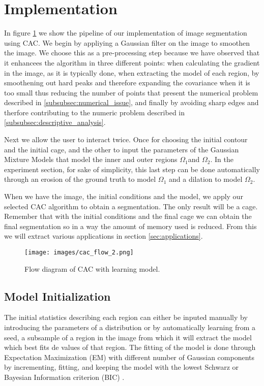 
\section{Implementation}
\label{subsec:implementation}
\noindent

In figure \ref{fig:cac_flow} we show the pipeline of our implementation of image segmentation using CAC. We begin by appliying a Gaussian filter on the image to smoothen the image. We choose this as a pre-processing step because we have observed that it enhancees the algorithm in three different points: when calculating the gradient in the image, as it is typically done, when extracting the model of each region, by smoothening out hard peaks and therefore expanding the covariance when it is too small thus reducing the number of points that present the numerical problem described in \ref{subsubsec:numerical_issue}, and finally by avoiding sharp edges and therfore contributing to the numeric problem described in \ref{subsubsec:descriptive_analysis}.

Next we allow the user to interact twice. Once for choosing the initial contour and the initial cage, and the other to input the parameters of the Gaussian Mixture Models that model the inner and outer regions $\Omega_1$and $\Omega_2$. In the experiment section, for sake of simplicity, this last step can be done automatically through an erosion of the ground truth to model $\Omega_1$ and a dilation to model $\Omega_2$.

When we have the image, the initial conditions and the model, we apply our selected CAC algorithm to obtain a segmentation. The only result will be a cage. Remember that with the initial conditions and the final cage we can obtain the final segmentation so in a way the amount of memory used is reduced. From this we will extract various applications in section \ref{sec:applications}.
\begin{figure}[h]
	\centering
	{\texttt{[image: images/cac\_flow\_2.png]}}
	\caption{Flow diagram of CAC with learning model.}
	\label{fig:cac_flow}
\end{figure}

\subsection{Model Initialization}

The initial statistics describing each region can either be inputed manually by introducing the parameters of a distribution or by automatically learning from a seed, a subsample of a region in the image from which it will extract the model which best fits de values of that region. The fitting of the model is done through Expectation Maximization (EM) with different number of Gaussian components by incrementing, fitting, and keeping the model with the lowest Schwarz or Bayesian Information criterion (BIC) .

